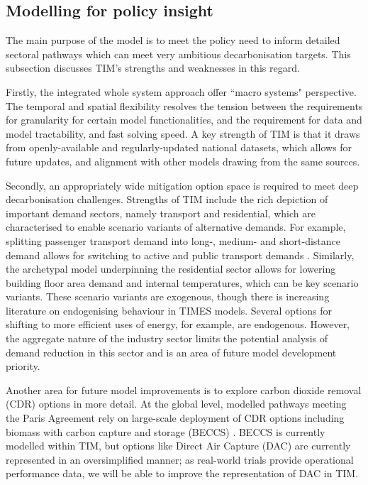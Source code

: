 \documentclass[gmd,manuscript]{copernicus}
\begin{document}
\subsection{Modelling for policy insight}
The main purpose of the model is to meet the policy need to inform detailed sectoral pathways which can meet very ambitious decarbonisation targets. This subsection discusses TIM's strengths and weaknesses in this regard. 

Firstly, the integrated whole system approach offer ``macro systems" perspective. The temporal and spatial flexibility resolves the tension between the requirements for granularity for certain model functionalities, and the requirement for data and model tractability, and fast solving speed. A key strength of TIM is that it draws from openly-available and regularly-updated national datasets, which allows for future updates, and alignment with other models drawing from the same sources.

Secondly, an appropriately wide mitigation option space is required to meet deep decarbonisation challenges. Strengths of TIM include the rich depiction of important demand sectors, namely transport and residential, which are characterised to enable scenario variants of alternative demands. For example, splitting passenger transport demand into long-, medium- and short-distance demand allows for switching to active and public transport demands . Similarly, the archetypal model underpinning the residential sector allows for lowering building floor area demand and internal temperatures, which can be key scenario variants. These scenario variants are exogenous, though there is increasing literature on endogenising behaviour in TIMES models. Several options for shifting to more efficient uses of energy, for example, are endogenous. However, the aggregate nature of the industry sector limits the potential analysis of demand reduction in this sector and is an area of future model development priority.

Another area for future model improvements is to explore carbon dioxide removal (CDR) options in more detail. At the global level, modelled pathways meeting the Paris Agreement rely on large-scale deployment of CDR options including biomass with carbon capture and storage (BECCS) \citep{IPCC2018}. BECCS is currently modelled within TIM, but options like Direct Air Capture (DAC) \citep{Realmonte2019} are currently represented in an oversimplified manner; as real-world trials provide operational performance data, we will be able to improve the representation of DAC in TIM.
\end{document}
